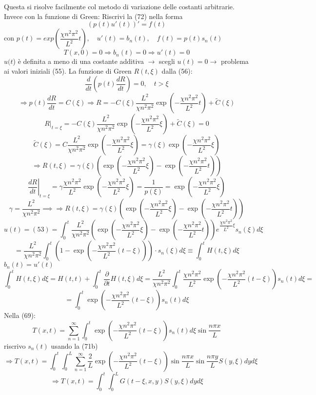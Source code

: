 \documentclass[a4paper,11pt]{report}
\begin{document}
Questa si risolve facilmente col metodo di variazione delle costanti arbitrarie. Invece con la funzione di Green: Riscrivi la (72) nella forma 
$$
(p(t)u'(t))'=f(t)
$$
con $p(t)=exp\left(\dfrac{\chi n^2 \pi^2}{L^2}t\right), \quad u'(t)=b_n(t),\quad f(t)=p(t)s_n(t)$
$$
T(x,0)=0 \Rightarrow b_n(t)=0 \Rightarrow u'(t)=0
$$
$u(t$) è definita a meno di una costante additiva $\rightarrow$ scegli $u(t)=0 \rightarrow$ problema ai valori iniziali (55). La funzione di Green $R(t,\xi)$ dalla (56):
$$
\dfrac{d}{dt}\left(p(t)\dfrac{dR}{dt}\right)=0, \quad t>\xi
$$
$$
\Rightarrow p(t)\dfrac{dR}{dt}=C(\xi) \Rightarrow R=-C(\xi)\dfrac{L^2}{\chi n^2\pi^2} \exp \left(-\dfrac{\chi n^2 \pi^2}{L^2}t\right)+\tilde{C}(\xi)
$$
$$
R|_{t=\xi}=-C(\xi)\dfrac{L^2}{\chi n^2\pi^2} \exp \left(-\dfrac{\chi n^2 \pi^2}{L^2}\xi \right)+\tilde{C}(\xi) =0
$$
$$
\tilde{C}(\xi)=C\dfrac{L^2}{\chi n^2 \pi^2}\exp \left(-\dfrac{\chi n^2 \pi^2}{L^2}\xi \right)=\gamma(\xi)\exp\left(-\dfrac{\chi n^2 \pi^2}{L^2}\xi \right)
$$
$$
\Rightarrow R(t,\xi)=\gamma(\xi)\left(\exp\left(-\dfrac{\chi n^2 \pi^2}{L^2}\xi \right) - \exp\left(-\dfrac{\chi n^2 \pi^2}{L^2}t \right)\right)
$$
$$
\left.\dfrac{dR}{dt}\right|_{t=\xi}=\gamma \dfrac{\chi n^2 \pi^2}{L^2}\exp\left(-\dfrac{\chi n^2 \pi^2}{L^2}\xi \right)=\dfrac{1}{p(\xi)}=\exp\left(-\dfrac{\chi n^2 \pi^2}{L^2}\xi \right)
$$
$$
\gamma=\dfrac{L^2}{\chi n^2 \pi^2} \implies \Rightarrow R(t,\xi)=\gamma(\xi)\left(\exp\left(-\dfrac{\chi n^2 \pi^2}{L^2}\xi \right) - \exp\left(-\dfrac{\chi n^2 \pi^2}{L^2}t \right)\right)
$$
$$
u(t)=(53)=\int_0^t \dfrac{L^2}{\chi n^2 \pi^2}\left( \exp\left(-\dfrac{\chi n^2 \pi^2}{L^2}\xi \right) - \exp\left(-\dfrac{\chi n^2 \pi^2}{L^2}t \right)\right)e^{\dfrac{\chi n^2 \pi^2}{L^2}\xi} s_n(\xi)d\xi
$$
$$
=\dfrac{L^2}{\chi n^2 \pi^2}\int_0^t\left( 1-\exp\left( -\dfrac{\chi n^2 \pi^2}{L^2}(t-\xi)\right)\right)\cdot s_n(\xi)d\xi \equiv \int_0^t H(t,\xi)d\xi
$$
$b_n(t)=u'(t)$
$$
\int_0^t H(t,\xi)d\xi=H(t,t) + \int_0^t \dfrac{\partial}{\partial t}H(t,\xi)d\xi=\dfrac{L^2}{\chi n^2\pi^2}\int_0^t \dfrac{\chi n^2 \pi^2}{L^2}\exp \left(-\dfrac{\chi n^2 \pi^2}{L^2}(t-\xi)\right) s_n(t)d\xi =
$$
$$
=\int_0^t \exp \left(-\dfrac{\chi n^2 \pi^2}{L^2}(t-\xi)\right) s_n(t)d\xi
$$
Nella (69):
$$
T(x,t)=\sum_{n=1}^{\infty}\int_0^t\exp \left(-\dfrac{\chi n^2 \pi^2}{L^2}(t-\xi)\right) s_n(t)d\xi \sin\dfrac{n\pi x}{L}
$$
riscrivo $s_n(t)$ usando la (71b)
$$
\Rightarrow T(x,t)=\int_0^t \int_0^L \sum_{n=1}^{\infty}\dfrac{2}{L}\exp \left(-\dfrac{\chi n^2 \pi^2}{L^2}(t-\xi)\right) \sin \dfrac{n\pi x}{L}\sin \dfrac{n\pi y}{L}S(y,\xi)dyd\xi
$$
\begin{equation}
\Rightarrow T(x,t)=\int_0^t \int_0^L G(t-\xi,x,y)S(y,\xi)dyd\xi
\end{equation}
\end{document}
